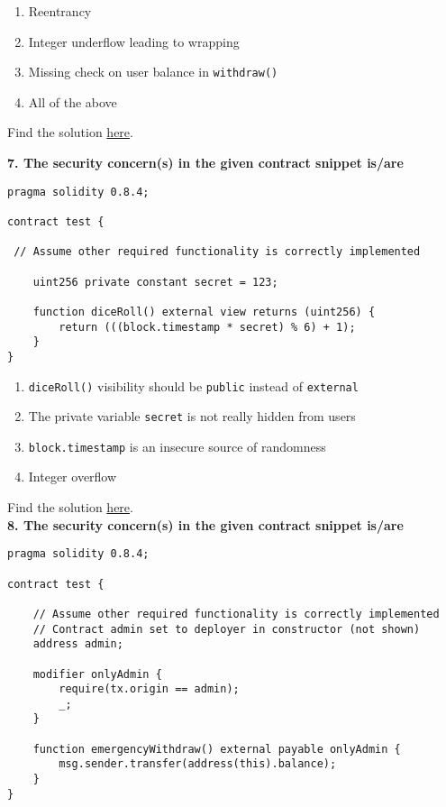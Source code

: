 \begin{enumerate}[label=\Alph*.]
    \item Reentrancy
    \item Integer underflow leading to wrapping
    \item Missing check on user balance in \verb|withdraw()|
    \item All of the above
\end{enumerate}

Find the solution \hyperref[sec:exam4_q6]{here}.\\

\pagebreak

\textbf{7. The security concern(s) in the given contract snippet is/are}

\begin{lstlisting}[language=Solidity, style=solStyle]
pragma solidity 0.8.4;

contract test {

 // Assume other required functionality is correctly implemented

    uint256 private constant secret = 123;

    function diceRoll() external view returns (uint256) {
        return (((block.timestamp * secret) % 6) + 1);
    }
}
\end{lstlisting}

\begin{enumerate}[label=\Alph*.]
    \item\verb|diceRoll()| visibility should be \verb|public| instead of \verb|external|
    \item The private variable \verb|secret| is not really hidden from users
    \item\verb|block.timestamp| is an insecure source of randomness
    \item Integer overflow
\end{enumerate}

Find the solution \hyperref[sec:exam4_q7]{here}.\\

\textbf{8. The security concern(s) in the given contract snippet is/are}

\begin{lstlisting}[language=Solidity, style=solStyle]
pragma solidity 0.8.4;

contract test {

    // Assume other required functionality is correctly implemented
    // Contract admin set to deployer in constructor (not shown)
    address admin;

    modifier onlyAdmin {
        require(tx.origin == admin);
        _;
    }

    function emergencyWithdraw() external payable onlyAdmin {
        msg.sender.transfer(address(this).balance);
    }
}
\end{lstlisting}

